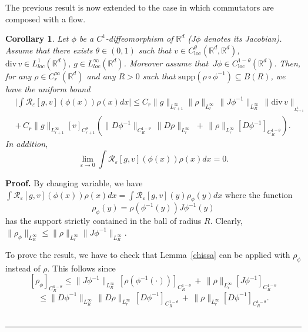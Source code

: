 \documentclass[a4paper,11pt]{article}
\newtheorem{corollary}[theorem]{Corollary}
\newenvironment{proof}[1][Proof]{\textbf{#1.} }{\ \rule{0.5em}{0.5em}}
\newcommand{\loc}{\mathrm{loc}}
\begin{document}
\medskip The previous result is now   extended to the case in which
commutators are composed with  a flow.

\begin{corollary}
 \label{dim1}Let $\phi$ be a $C^{1}$-diffeomorphism of
 $\mathbb{R}^{d}$ ($J \phi$ denotes its Jacobian). Assume
  that there exists $\theta \in (0,1)$ such that
  $     v \in C_{\loc}^{\theta}(
\mathbb{R}^{d}, \mathbb{R}^{d}) $, ${\mathrm{div}\,}v\in
L_{loc}^{1}\left( \mathbb{R}^{d}\right)$, $g \in
L_{loc}^{\infty}\left( \mathbb{R}^{d}\right)$. Moreover assume that
 $
 \, J \phi \in C_{\loc}^{1- \theta}( \mathbb{R}^{d}).
$  Then, for any $\rho \in C_r^{\infty}(  \mathbb{R}^{d})$ and any
$R>0$ such that $\mathrm{supp}( \rho\circ \phi^{-1}) \subseteq
B(R)$,
 we have the  uniform bound
\begin{equation} \label{f56}
\begin{split}
& \Big | \int\mathcal{R}_{\varepsilon}\left[ g,v\right] \left(
\phi\left( x\right)  \right)  \rho\left( x\right)  dx \Big|
\le
 C_r \| g\|_{L^{\infty}_{r+1}}  \|
\rho\|_{L^{\infty}_{r}}\, \| J\phi^{-1}\| _{L_{R}^{\infty}}\,
 \| {\mathrm{div}\,} v
\|_{_{L_{r+1}^{1}}}
\\ & +  \, C_r \| g\|_{L^{\infty}_{r+1}} [ v ]_{C^{ \theta}_{r+1}} ( \|
D\phi^{-1}\| _{C^{1- \theta }_{R}} \,  \| D\rho\| _{L_{r}^{\infty}}
\,
 \, + \, \| \rho \|_{L_{r}^{\infty}}
 [D\phi^{-1}]_{C^{1- \theta }_{R}}) .
\end{split}
\end{equation}
 In addition,
\[
\lim_{\varepsilon\rightarrow0}\int\mathcal{R}_{\varepsilon}\left[
g,v\right] \left(  \phi\left(  x\right)  \right)  \rho\left(
x\right)  dx=0.
\]
\end{corollary}
\begin{proof}
 By changing variable, we have $ \int\mathcal{R}_{\varepsilon}[
g,v] (  \phi(  x) )  \rho( x) dx=\int\mathcal{R}_{\varepsilon}[ g,v]
(  y)  \rho_{\phi}(  y) dx $ where the function
 $$ \rho_{\phi}(  y)  =\rho(  \phi^{-1}( y) )
 J\phi^{-1}(  y)
 $$
 has the support strictly contained in the ball
of radius $R$. Clearly, $
 \|  \rho_{\phi}\| _{L_{R}^{\infty}}\leq \| \rho\|
_{L_{r}^{\infty}}\| J\phi^{-1}\| _{L_{R}^{\infty}}. $

To prove the result, we  have to check that
 Lemma~\ref{chissa} can be applied with $\rho_{\phi}$
  instead of $\rho$.
  This follows since
$$
[\rho_{\phi} ]_{ C^{1 - \theta }_{R}} \le
 \| J\phi^{-1}\|
_{L_{R}^{\infty}} \, [\rho ({\phi}^{-1} (\cdot) ) ]_{ C^{1- \theta
}_{R}} \, + \, \| \rho \|_{L_{r}^{\infty}}
 [J\phi^{-1}]_{C^{1- \theta }_{R}}
$$
$$
\le  \| D\phi^{-1}\| _{L_{R}^{\infty}} \,  \| D\rho\|
_{L_{r}^{\infty}} \, [ D\phi^{-1}]_{C^{1- \theta }_{R}}
 \, + \, \| \rho \|_{L_{r}^{\infty}}
 [D\phi^{-1}]_{C^{1- \theta }_{R}}.
$$
\end{proof}
\end{document}
